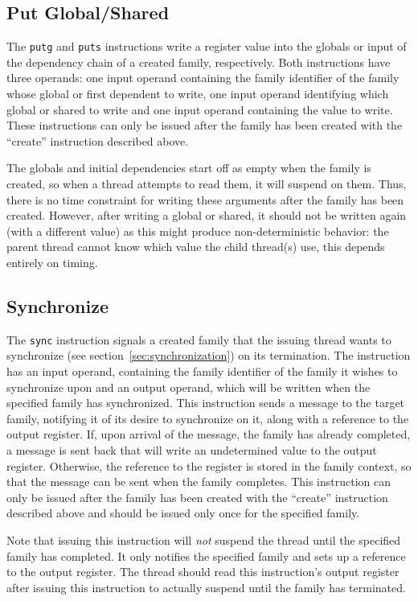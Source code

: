 \subsection{Put Global/Shared}
The {\tt putg} and {\tt puts} instructions write a register value into the globals or input of the dependency chain of a created family, respectively. Both instructions have three operands: one input operand containing the family identifier of the family whose global or first dependent to write, one input operand identifying which global or shared to write and one input operand containing the value to write. These instructions can only be issued after the family has been created with the ``create'' instruction described above.

The globals and initial dependencies start off as empty when the family is created, so when a thread attempts to read them, it will suspend on them. Thus, there is no time constraint for writing these arguments after the family has been created. However, after writing a global or shared, it should not be written again (with a different value) as this might produce non-deterministic behavior: the parent thread cannot know which value the child thread(s) use, this depends entirely on timing.

\subsection{Synchronize}
The {\tt sync} instruction signals a created family that the issuing thread wants to synchronize (see section~\ref{sec:synchronization}) on its termination. The instruction has an input operand, containing the family identifier of the family it wishes to synchronize upon and an output operand, which will be written when the specified family has synchronized. This instruction sends a message to the target family, notifying it of its desire to synchronize on it, along with a reference to the output register. If, upon arrival of the message, the family has already completed, a message is sent back that will write an undetermined value to the output register. Otherwise, the reference to the register is stored in the family context, so that the message can be sent when the family completes. This instruction can only be issued after the family has been created with the ``create'' instruction described above and should be issued only once for the specified family.

Note that issuing this instruction will \emph{not} suspend the thread until the specified family has completed. It only notifies the specified family and sets up a reference to the output register. The thread should read this instruction's output register after issuing this instruction to actually suspend until the family has terminated.

